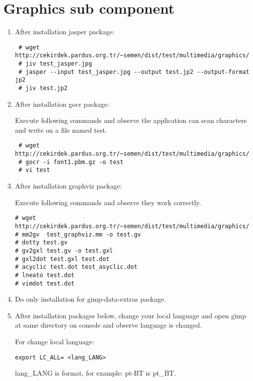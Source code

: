 \documentclass[a4paper,10pt]{article}
\begin{document}
\section{Graphics sub component}
\begin{enumerate}
\item After installation jasper package:

\begin{verbatim}
 # wget http://cekirdek.pardus.org.tr/~semen/dist/test/multimedia/graphics/test_jasper.jpg
 # jiv test_jasper.jpg
 # jasper --input test_jasper.jpg --output test.jp2 --output-format jp2
 # jiv test.jp2
\end{verbatim}


 \item After installation gocr package:

Execute following commands and observe the application can scan characters and write on a file named test.
\begin{verbatim}
 # wget http://cekirdek.pardus.org.tr/~semen/dist/test/multimedia/graphics/font1.pbm.gz
 # gocr -i font1.pbm.gz -o test
 # vi test
\end{verbatim}

\item After installation graphviz package:

Execute following commands and observe they work correctly.
\begin{verbatim}
# wget http://cekirdek.pardus.org.tr/~semen/dist/test/multimedia/graphics/test_graphviz.mm
# mm2gv  test_graphviz.mm -o test.gv
# dotty test.gv
# gv2gxl test.gv -o test.gxl 
# gxl2dot test.gxl test.dot
# acyclic test.dot test_asyclic.dot
# lneato test.dot
# vimdot test.dot
\end{verbatim}



 \item Do only installation for gimp-data-extras package.
 \item After installation packages below, change your local language and open gimp at same directory on console and observe language is changed.

For change local language:
\begin{verbatim}
export LC_ALL= <lang_LANG>
\end{verbatim}

lang\_LANG is format, for example: pt-BT is pt\_BT.


\end{enumerate}
\end{document}
